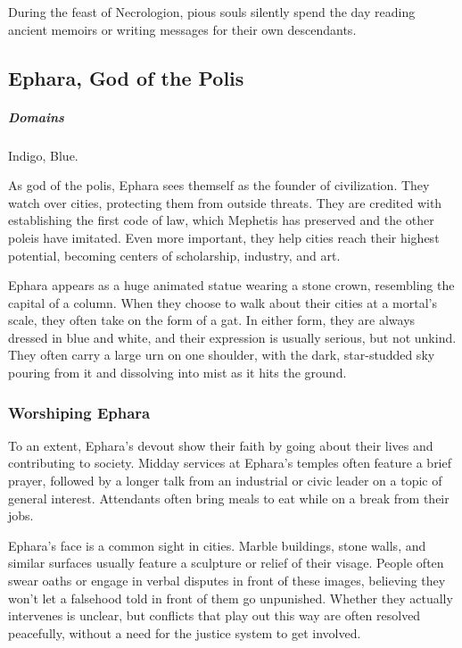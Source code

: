         During the feast of Necrologion, pious souls silently spend the day reading ancient memoirs or writing messages for their own descendants.
\subsection*{Ephara, God of the Polis} \label{ssec::ephara}
    \subparagraph{Domains} Indigo, Blue.

    As god of the polis, Ephara sees themself as the founder of civilization.
    They watch over cities, protecting them from outside threats.
    They are credited with establishing the first code of law, which Mephetis has preserved and the other poleis have imitated.
    Even more important, they help cities reach their highest potential, becoming centers of scholarship, industry, and art.

    Ephara appears as a huge animated statue wearing a stone crown, resembling the capital of a column.
    When they choose to walk about their cities at a mortal's scale, they often take on the form of a gat.
    In either form, they are always dressed in blue and white, and their expression is usually serious, but not unkind.
    They often carry a large urn on one shoulder, with the dark, star-studded sky pouring from it and dissolving into mist as it hits the ground.


    \subsubsection{Worshiping Ephara}
        To an extent, Ephara's devout show their faith by going about their lives and contributing to society.
        Midday services at Ephara's temples often feature a brief prayer, followed by a longer talk from an industrial or civic leader on a topic of general interest.
        Attendants often bring meals to eat while on a break from their jobs.

        Ephara's face is a common sight in cities.
        Marble buildings, stone walls, and similar surfaces usually feature a sculpture or relief of their visage.
        People often swear oaths or engage in verbal disputes in front of these images, believing they won't let a falsehood told in front of them go unpunished.
        Whether they actually intervenes is unclear, but conflicts that play out this way are often resolved peacefully, without a need for the justice system to get involved.

